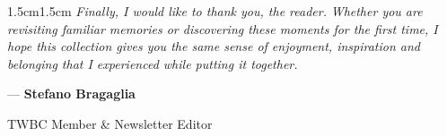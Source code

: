 \begin{adjustwidth}{1.5cm}{1.5cm}
    \null
    \textit{Finally, I would like to thank you, the reader.}
    \textit{Whether you are revisiting familiar memories or discovering these moments for the first time, I hope this collection gives you the same sense of enjoyment, inspiration and belonging that I experienced while putting it together.}

    \null
    \hfill --- \textbf{Stefano Bragaglia}

    \hfill TWBC Member \& Newsletter Editor
\end{adjustwidth}
